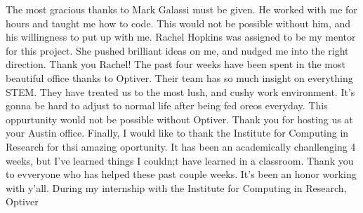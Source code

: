 \documentclass[a4paper,10pt]{article}
\newcounter{code}[section]
\begin{document}
The most gracious thanks to Mark Galassi must be given. He worked with me for hours and taught me how to code. This would not be possible without him, and his willingness to put up with me. Rachel Hopkins was assigned to be my mentor for this project. She pushed brilliant ideas on me, and nudged me into the right direction. Thank you Rachel! The past four weeks have been spent in the most beautiful office thanks to Optiver. Their team has so much insight on everything STEM. They have treated us to the most lush, and cushy work environment. It's gonna be hard to adjust to normal life after being fed oreos everyday. This oppurtunity would not be possible without Optiver. Thank you for hosting us at your Austin office. Finally, I would like to thank the Institute for Computing in Research for thsi amazing oportunity. It has been an academically chanllenging 4 weeks, but I've learned things I couldn;t have learned in a classroom. Thank you to evveryone who has helped these past couple weeks. It's been an honor working with y'all.
During my internship with the Institute for Computing in Research, Optiver 


 
 
\end{document}
